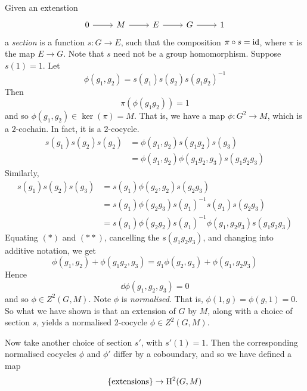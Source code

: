 \documentclass{article}
\begin{document}
Given an extenstion
    \[\begin{tikzcd}
        0 & M & E & G & 1
        \arrow[from=1-1, to=1-2]
        \arrow[from=1-2, to=1-3]
        \arrow[from=1-3, to=1-4]
        \arrow[from=1-4, to=1-5]
    \end{tikzcd}\]
a \emph{section} is a function \(s : G \to E\), such that the composition \(\pi \circ s = \operatorname{id}\), where \(\pi\) is the map \(E \to G\). Note that \(s\) need not be a group homomorphism. Suppose \(s(1) = 1\). Let
\[\phi(g_1,g_2) = s(g_1)s(g_2)s(g_1g_2)^{-1}\]
Then
\[\pi(\phi(g_1g_2)) = 1\]
and so \(\phi(g_1, g_2) \in \ker(\pi) = M\). That is, we have a map \(\phi : G^2 \to M\), which is a \(2\)-cochain. In fact, it is a \(2\)-cocycle.
\begin{align*}
    s(g_1)s(g_2)s(g_2) &= \phi(g_1, g_2)s(g_1g_2)s(g_3) \\
    &= \phi(g_1,g_2)\phi(g_1g_2,g_3)s(g_1g_2g_3) \tag{\(*\)}
\end{align*}
Similarly,
\begin{align*}
    s(g_1)s(g_2)s(g_3) &= s(g_1)\phi(g_2, g_2)s(g_2g_3) \\
    &= s(g_1)\phi(g_2g_3)s(g_1)^{-1}s(g_1)s(g_2g_3) \\
    &= s(g_1)\phi(g_2g_2)s(g_1)^{-1}\phi(g_1, g_2g_3)s(g_1g_2g_3) \tag{\(**\)}
\end{align*}
Equating \((*)\) and \((**)\), cancelling the \(s(g_1g_2g_3)\), and changing into additive notation, we get
\[\phi(g_1, g_2) + \phi(g_1g_2, g_3) = g_1\phi(g_2, g_3) + \phi(g_1, g_2g_3)\]
Hence
\[\dd\phi(g_1, g_2, g_3) = 0\]
and so \(\phi \in Z^2(G, M)\). Note \(\phi\) is \emph{normalised}. That is, \(\phi(1, g) = \phi(g, 1) = 0\). So what we have shown is that an extension of \(G\) by \(M\), along with a choice of section \(s\), yields a normalised 2-cocycle \(\phi \in Z^2(G, M)\).

Now take another choice of section \(s'\), with \(s'(1) = 1\). Then the corresponding normalised cocycles \(\phi\) and \(\phi'\) differ by a coboundary, and so we have defined a map
\[\{\text{extensions}\} \to \mathrm{H}^2(G, M)\]

\lec
\end{document}
